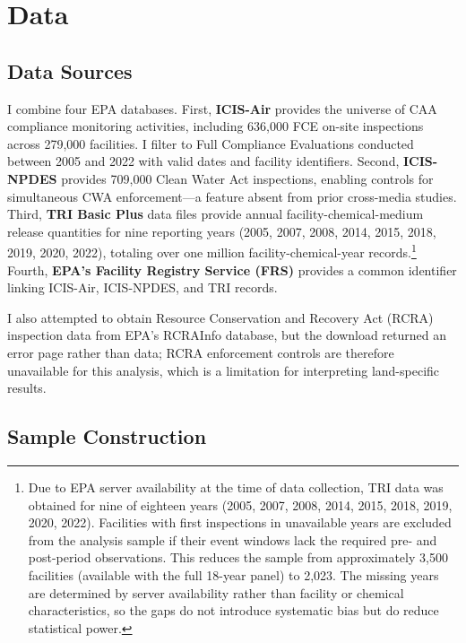 \documentclass[12pt]{article}
\begin{document}
\section{Data}
\label{sec:data}

\subsection{Data Sources}

I combine four EPA databases. First, \textbf{ICIS-Air} provides the universe of CAA compliance monitoring activities, including 636,000 FCE on-site inspections across 279,000 facilities. I filter to Full Compliance Evaluations conducted between 2005 and 2022 with valid dates and facility identifiers. Second, \textbf{ICIS-NPDES} provides 709,000 Clean Water Act inspections, enabling controls for simultaneous CWA enforcement---a feature absent from prior cross-media studies. Third, \textbf{TRI Basic Plus} data files provide annual facility-chemical-medium release quantities for nine reporting years (2005, 2007, 2008, 2014, 2015, 2018, 2019, 2020, 2022), totaling over one million facility-chemical-year records.\footnote{Due to EPA server availability at the time of data collection, TRI data was obtained for nine of eighteen years (2005, 2007, 2008, 2014, 2015, 2018, 2019, 2020, 2022). Facilities with first inspections in unavailable years are excluded from the analysis sample if their event windows lack the required pre- and post-period observations. This reduces the sample from approximately 3,500 facilities (available with the full 18-year panel) to 2,023. The missing years are determined by server availability rather than facility or chemical characteristics, so the gaps do not introduce systematic bias but do reduce statistical power.} Fourth, \textbf{EPA's Facility Registry Service (FRS)} provides a common identifier linking ICIS-Air, ICIS-NPDES, and TRI records.

I also attempted to obtain Resource Conservation and Recovery Act (RCRA) inspection data from EPA's RCRAInfo database, but the download returned an error page rather than data; RCRA enforcement controls are therefore unavailable for this analysis, which is a limitation for interpreting land-specific results.

\subsection{Sample Construction}
\end{document}
